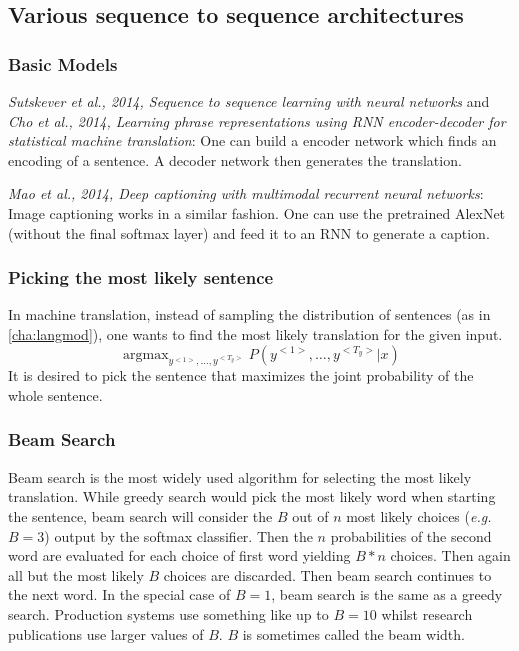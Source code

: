 \documentclass{article}
\begin{document}
\subsection{Various sequence to sequence architectures}
\subsubsection{Basic Models}
\emph{Sutskever et al., 2014, Sequence to sequence learning with neural networks} and
\emph{Cho et al., 2014, Learning phrase representations using RNN encoder-decoder for statistical machine translation}:
One can build a encoder network which finds an encoding of a sentence.
A decoder network then generates the translation.

\emph{Mao et al., 2014, Deep captioning with multimodal recurrent neural networks}:
Image captioning works in a similar fashion.
One can use the pretrained AlexNet (without the final softmax layer) and feed it to an RNN to generate a caption.

\subsubsection{Picking the most likely sentence}
In machine translation, instead of sampling the distribution of sentences (as in \cref{cha:langmod}),
one wants to find the most likely translation for the given input.
\begin{equation}
  \mathop{\operatorname{argmax}}_{y^{<1>},\ldots,y^{<T_y>}}P(y^{<1>},\ldots,y^{<T_y>}|x)
\end{equation}
It is desired to pick the sentence that maximizes the joint probability of the whole sentence.

\subsubsection{Beam Search}
Beam search is the most widely used algorithm for selecting the most likely translation.
While greedy search would pick the most likely word when starting the sentence,
beam search will consider the $B$ out of $n$ most likely choices (\emph{e.g.} $B=3$) output by the softmax classifier.
Then the $n$ probabilities of the second word are evaluated for each choice of first word yielding $B*n$ choices.
Then again all but the most likely $B$ choices are discarded.
Then beam search continues to the next word.
In the special case of $B=1$, beam search is the same as a greedy search.
Production systems use something like up to $B=10$ whilst research publications use larger values of $B$.
$B$ is sometimes called the beam width.
\end{document}
